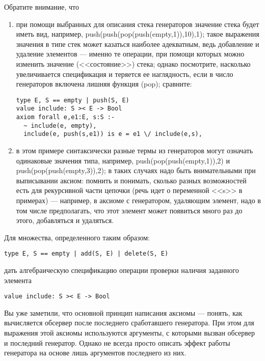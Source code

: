 Обратите внимание, что
\begin{enumerate}
\item при помощи выбранных для описания стека генераторов значение стека будет иметь вид, например, push(push(pop(push(empty,1)),10),1); такое выражения значения в типе стек может казаться наиболее адекватным, ведь добавление и удаление элементов --- именно те операции, при помощи которых можно изменить значение (<<состояние>>) стека; однако посмотрите, насколько увеличивается спецификация и теряется ее наглядность, если в число генераторов включена лишняя функция (pop); сравните:
\begin{lstlisting}
type E, S == empty | push(S, E)
value include: S >< E -> Bool
axiom forall e,e1:E, s:S :-
  ~ include(e, empty),
  include(e, push(s,e1)) is e = e1 \/ include(e,s),
\end{lstlisting}

\item в этом примере синтаксически разные термы из генераторов могут означать одинаковые значения типа, например, push(pop(push(empty,1)),2) и push(pop(push(empty,3)),2); в таких случаях надо быть внимательными при выписывании аксиом: помнить и понимать, сколько разных возможностей есть для рекурсивной части цепочки (речь идет о переменной <<s>> в примерах) --- например, в аксиоме с генератором, удаляющим элемент, надо в том числе предполагать, что этот элемент может появиться много раз до этого, добавляться и удаляться.
\end{enumerate}



\z Для множества, определенного таким образом:
\begin{lstlisting}
type E, S == empty | add(S, E) | delete(S, E)
\end{lstlisting}
дать алгебраическую спецификацию операции проверки наличия заданного элемента
\begin{lstlisting}
value include: S >< E -> Bool
\end{lstlisting}



Вы уже заметили, что основной принцип написания аксиомы --- понять, как вычисляется обсервер после последнего сработавшего генератора. При этом для выражения этой аксиомы используются аргументы, с которыми вызван обсервер и последний генератор. Однако не всегда просто описать эффект работы генератора на основе лишь аргументов последнего из них.

